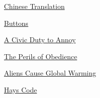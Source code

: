               
                
              
              
              
                \href{http://docs.google.com/View?id=dc6j46vg\_14cw826pxd}{Chinese Translation}


              
            
            
              
            
            
              
                
              
              
              
                \href{http://armandfrasco.typepad.com/armandele/2004/01/paul\_graham.html}{Buttons}


              
              
              
                
              
              
              
                \href{http://www.archub.org/civicduty.txt}{A Civic Duty to Annoy}


              
            
            
              
            
            
              
                
              
              
              
                \href{http://www.paulgraham.com/perils.html}{The Perils of Obedience}


              
              
              
                
              
              
              
                \href{http://www.crichton-official.com/speeches/speeches\_quote04.html}{Aliens Cause Global Warming}


              
            
            
              
            
            
              
                
              
              
              
                \href{http://www.artsreformation.com/a001/hays-code.html}{Hays Code}


